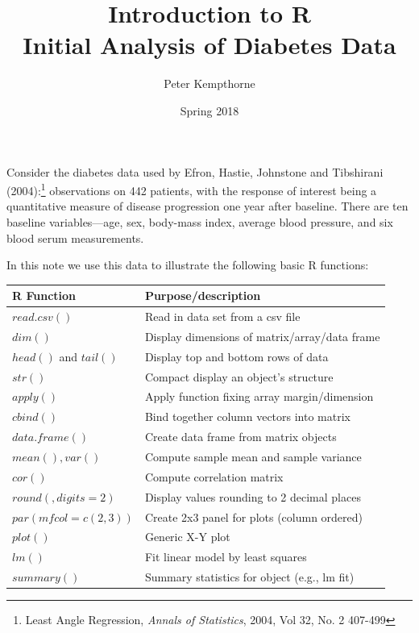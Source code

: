 \documentclass{article}
\title{Introduction to R\\Initial Analysis of Diabetes Data}
\author{Peter Kempthorne  }
\date{Spring 2018}
\begin{document}

\maketitle

 Consider the diabetes data used by Efron, Hastie, Johnstone and Tibshirani (2004):\footnote{Least Angle Regression, {\it Annals of Statistics}, 2004, Vol 32, No. 2 407-499}
 observations on 442 patients, with the response of interest being a quantitative measure of disease progression one year after baseline. 
There are ten baseline variables---age, sex, body-mass index, average blood pressure, and six blood serum measurements. 


In this note we use this data to illustrate the following basic R functions:

\vspace*{.5in}

\begin{tabular}{ll}
R Function & Purpose/description\\ \hline
$read.csv()$ & Read in data set from a csv file \\
$dim()$ & Display dimensions of matrix/array/data frame \\
$head()$ and $tail()$ & Display top and bottom rows of data\\
$str()$ & Compact display an object's structure\\
$apply()$ & Apply function fixing array margin/dimension\\
$cbind()$ & Bind together column vectors into matrix\\
$data.frame()$ & Create data frame from matrix objects\\
$mean(), var()$ & Compute sample mean and sample variance\\
$cor()$ & Compute correlation matrix \\
$round(,digits=2)$ & Display values rounding to 2 decimal places\\
$par(mfcol=c(2,3))$ & Create 2x3 panel for plots (column ordered)\\
$plot()$ & Generic X-Y  plot \\
$lm()$ & Fit linear model by least squares \\
$summary()$ & Summary statistics for object (e.g., lm fit)\\
\end{tabular}

\newpage
\end{document}
